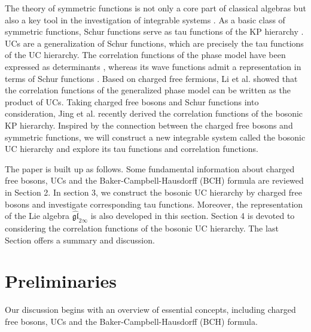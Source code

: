 \documentclass[11pt,reqno]{amsart}
\numberwithin{equation}{section}
\begin{document}
The theory of symmetric functions is not only a core part of classical algebras but also a key tool in the investigation of integrable systems \cite{Mac,Macdonald_integrable,Toda_KP,symmetric_integrable}. As a basic class of symmetric functions, Schur functions serve as tau functions of the KP hierarchy \cite{Jimbo2000}. UCs \cite{universal_characters} are a generalization of Schur functions, which are precisely the tau functions of the UC hierarchy. The correlation functions of the phase model have been expressed as determinants \cite{correctionphase}, whereas its wave functions admit a representation in terms of Schur functions \cite{model-symmetricfunction}. Based on charged free fermions,  Li et al. \cite{correclation_GPM} showed that  the correlation functions of the generalized phase model can be written as the product of UCs. Taking charged free bosons and Schur functions into consideration, Jing et al. \cite{bosoncorreclation} recently derived the correlation functions of the bosonic KP  hierarchy. Inspired by the connection between the charged free bosons and symmetric functions, we will construct a new integrable system called the bosonic UC hierarchy and explore its tau functions and correlation functions.

The paper is built up as follows. Some fundamental information about charged free bosons, UCs and the Baker-Campbell-Hausdorff (BCH) formula are reviewed in Section 2. In section 3, we construct the bosonic UC hierarchy by charged free bosons and investigate corresponding tau functions. Moreover, the representation of the Lie algebra $\mathfrak{\widehat{gl}}_{2\infty}$ is also developed in this section.  Section 4 is devoted to considering the correlation functions of the bosonic UC hierarchy. The last Section offers a summary and discussion.


\section{Preliminaries}
Our discussion begins with an overview of essential concepts, including charged free bosons, UCs and the Baker-Campbell-Hausdorff (BCH) formula\cite{bosoncorreclation,tau_function_boson,universal_characters,UC,MKP_Boson,
BCH_formula}.
\end{document}
